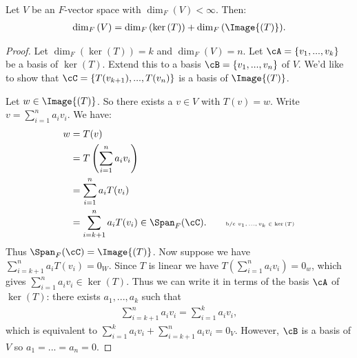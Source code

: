     \begin{theorem}
        Let $V$ be an $F$-vector space with $\dim_F{(V)} < \infty$. Then:
            \begin{equation*}
            \begin{split}
                \dim_F{(V)} = \dim_F{(\ker{(T)})} + \dim_F{(\Image{(T)})}.
            \end{split}
            \end{equation*}
    \end{theorem}
        \begin{proof}
            Let $\dim_F{(\ker{(T)})} = k$ and $\dim_F{(V)} = n$. Let $\cA = \{v_1,...,v_k\}$ be a basis of $\ker{(T)}$. Extend this to a basis $\cB = \{v_1,...,v_n\}$ of $V$. We'd like to show that $\cC = \{T(v_{k+1}),...,T(v_n)\}$ is a basis of $\Image{(T)}$.

            Let $w \in \Image{(T)}$. So there exists a $v \in V$ with $T(v) = w$. Write $v = \sum_{i = 1}^n a_i v_i$. We have:
                \begin{equation*}
                \begin{split}
                    w 
                    & = T(v) \\
                    & = T\left(\sum_{i = 1}^n a_i v_i\right) \\
                    & = \sum_{i = 1}^n a_i T(v_i) \\
                    & = \sum_{i = k+1}^n a_i T(v_i) \in \Span_F{(\cC)}.  \quad\quad \text{\tiny b/c $v_1,...,v_k \in \ker{(T)}$}\\
                \end{split}
                \end{equation*}
            Thus $\Span_F{(\cC)} = \Image{(T)}$. Now suppose we have $\sum_{i = k+1}^n a_i T(v_i) = 0_W$. Since $T$ is linear we have $T(\sum_{i = 1}^n a_i v_i) = 0_w$, which gives $\sum_{i = 1}^n a_i v_i \in \ker{(T)}$. Thus we can write it in terms of the basis $\cA$ of $\ker{(T)}$: there exists $a_1,...,a_k$ such that 
                \begin{equation*}
                \begin{split}
                    \sum_{i = k+1}^n a_i v_i = \sum_{i=1}^k a_i v_i,
                \end{split}
                \end{equation*}
            which is equivalent to $\sum_{i = 1}^k a_i v_i + \sum_{i = k+1}^n a_i v_i = 0_V$. However, $\cB$ is a basis of $V$ so $a_1 = ... = a_n = 0$.
        \end{proof}
    
